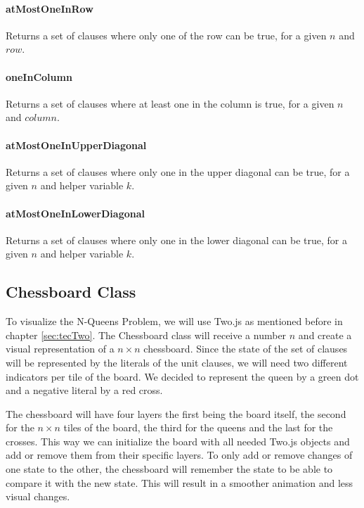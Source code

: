 \paragraph{atMostOneInRow}
Returns a set of clauses where only one of the row can be true, for a given $n$ and $row$.

\paragraph{oneInColumn}
Returns a set of clauses where at least one in the column is true, for a given $n$ and $column$.

\paragraph{atMostOneInUpperDiagonal}
Returns a set of clauses where only one in the upper diagonal can be true, for a given $n$ and helper variable $k$.

\paragraph{atMostOneInLowerDiagonal}
Returns a set of clauses where only one in the lower diagonal can be true, for a given $n$ and helper variable $k$.

\subsection{Chessboard Class}
\label{sub:impChessboard}
To visualize the N-Queens Problem, we will use Two.js as mentioned before in chapter \ref{sec:tecTwo}. The Chessboard class will receive a number $n$ and create a visual representation of a $n \times n$ chessboard. Since the state of the set of clauses will be represented by the literals of the unit clauses, we will need two different indicators per tile of the board. We decided to represent the queen by a green dot and a negative literal by a red cross.

The chessboard will have four layers the first being the board itself, the second for the $n \times n$ tiles of the board, the third for the queens and the last for the crosses. This way we can initialize the board with all needed Two.js objects and add or remove them from their specific layers. To only add or remove changes of one state to the other, the chessboard will remember the state to be able to compare it with the new state. This will result in a smoother animation and less visual changes.

